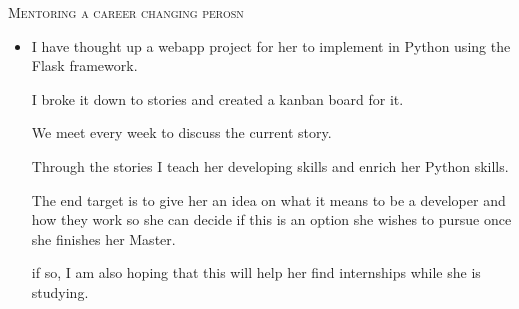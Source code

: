 %
%
%

	\begin{scholarship}
    {
        \textsc{Mentoring a career changing perosn}
        \begin{itemize}
          \item I have thought up a webapp project for her to implement in Python using the Flask framework.

          I broke it down to stories and created a kanban board for it.

          We meet every week to discuss the current story.

          Through the stories I teach her developing skills and enrich her Python skills.

          The end target is to give her an idea on what it means to be a developer and how they work so she can decide if this is an option she wishes to pursue once she finishes her Master.

          if so, I am also hoping that this will help her find internships while she is studying.
				\end{itemize}
			}
	\end{scholarship}